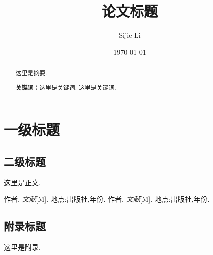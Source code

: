 \documentclass[12pt, a4paper, oneside]{ctexart} %
\title{\textbf{论文标题}}
\author{Sijie Li}
\date{\today}
\begin{document}
\maketitle

\setcounter{page}{0} %
\maketitle
\thispagestyle{empty}

\begin{abstract}
    这里是摘要.
    \par\textbf{关键词：}这里是关键词; 这里是关键词.
\end{abstract}

\newpage 
{}
\setcounter{page}{1}
\tableofcontents

\newpage
\setcounter{page}{1}

\section{一级标题}

\subsection{二级标题}

这里是正文.

\newpage

\begin{thebibliography}{99}
    作者. \emph{文献}[M]. 地点:出版社,年份.
    作者. \emph{文献}[M]. 地点:出版社,年份.
\end{thebibliography}

\newpage

\begin{appendices}
    \renewcommand{\thesection}{\Alph{section}}
    \section{附录标题}
        这里是附录.
\end{appendices}
\end{document}
